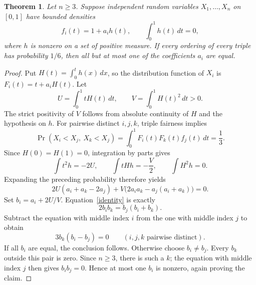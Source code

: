 \documentclass[11pt]{article}
\newtheorem{theorem}{Theorem}
\begin{document}
\begin{theorem}\label{density}
Let $n\ge3$. Suppose independent random variables $X_1,\ldots,X_n$ on
$[0,1]$ have bounded densities
\[
 f_i(t)=1+a_i h(t),\qquad \int_0^1h(t)\,dt=0,
\]
where $h$ is nonzero on a set of positive measure. If every ordering of
every triple has probability $1/6$, then all but at most one of the
coefficients $a_i$ are equal.
\end{theorem}
\begin{proof}
Put $H(t)=\int_0^t h(x)\,dx$, so the distribution function of $X_i$ is
$F_i(t)=t+a_iH(t)$. Let
\[
 U=\int_0^1 tH(t)\,dt,\qquad V=\int_0^1H(t)^2\,dt>0.
\]
The strict positivity of $V$ follows from absolute continuity of $H$ and
the hypothesis on $h$. For pairwise distinct $i,j,k$, triple fairness
implies
\[
 \Pr(X_i<X_j,\ X_k<X_j)=\int_0^1F_i(t)F_k(t)f_j(t)\,dt=\frac13.
\]
Since $H(0)=H(1)=0$, integration by parts gives
\[
 \int t^2h=-2U,\qquad
 \int tHh=-\frac V2,\qquad \int H^2h=0.
\]
Expanding the preceding probability therefore yields
\begin{equation}\label{identity}
 2U(a_i+a_k-2a_j)
  +V\bigl(2a_i a_k-a_j(a_i+a_k)\bigr)=0.
\end{equation}
Set $b_i=a_i+2U/V$. Equation~\eqref{identity} is exactly
\[
 2b_i b_k=b_j(b_i+b_k).
\]
Subtract the equation with middle index $i$ from the one with middle
index $j$ to obtain
\[
 3b_k(b_i-b_j)=0\qquad(i,j,k\text{ pairwise distinct}).
\]
If all $b_i$ are equal, the conclusion follows. Otherwise choose
$b_i\ne b_j$. Every $b_k$ outside this pair is zero. Since $n\ge3$,
there is such a $k$; the equation with middle index $j$ then gives
$b_i b_j=0$. Hence at most one $b_i$ is nonzero, again proving the claim.
\end{proof}
\end{document}
